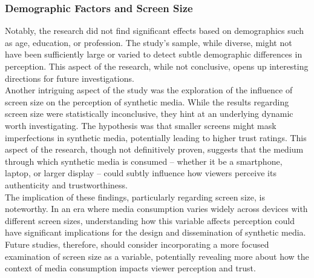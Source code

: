 \documentclass[
  a4paper,  %
  twoside,  %
  bibliography=totoc,
  headsepline,
  cleardoublepage=empty,
  parskip=half,
  draft=false
]{scrbook}
\begin{document}
\subsubsection{Demographic Factors and Screen Size}
Notably, the research did not find significant effects based on demographics such as age, education, or profession. The study's sample, while diverse, might not have been sufficiently large or varied to detect subtle demographic differences in perception. This aspect of the research, while not conclusive, opens up interesting directions for future investigations. \\
Another intriguing aspect of the study was the exploration of the influence of screen size on the perception of synthetic media. While the results regarding screen size were statistically inconclusive, they hint at an underlying dynamic worth investigating. The hypothesis was that smaller screens might mask imperfections in synthetic media, potentially leading to higher trust ratings. This aspect of the research, though not definitively proven, suggests that the medium through which synthetic media is consumed – whether it be a smartphone, laptop, or larger display – could subtly influence how viewers perceive its authenticity and trustworthiness. \\
The implication of these findings, particularly regarding screen size, is noteworthy. In an era where media consumption varies widely across devices with different screen sizes, understanding how this variable affects perception could have significant implications for the design and dissemination of synthetic media. Future studies, therefore, should consider incorporating a more focused examination of screen size as a variable, potentially revealing more about how the context of media consumption impacts viewer perception and trust.
\end{document}
